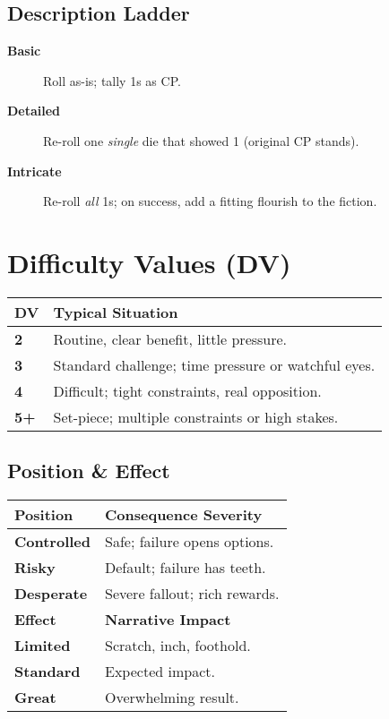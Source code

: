 \begin{multicols}{2}
\subsection*{Description Ladder}
\begin{description}
  \item[\textbf{Basic}] Roll as-is; tally 1s as CP.
  \item[\textbf{Detailed}] Re-roll one \emph{single} die that showed 1 (original CP stands).
  \item[\textbf{Intricate}] Re-roll \emph{all} 1s; on success, add a fitting flourish to the fiction.
\end{description}

\section{Difficulty Values (DV)}
\begin{center}
\begin{tabular}{lp{7.5cm}}
\toprule
\textbf{DV} & \textbf{Typical Situation} \\
\midrule
\textbf{2} & Routine, clear benefit, little pressure. \\
\textbf{3} & Standard challenge; time pressure or watchful eyes. \\
\textbf{4} & Difficult; tight constraints, real opposition. \\
\textbf{5+} & Set-piece; multiple constraints or high stakes. \\
\bottomrule
\end{tabular}
\end{center}

\subsection*{Position \& Effect}
\begin{center}
\begin{tabular}{lp{6.6cm}}
\toprule
\textbf{Position} & \textbf{Consequence Severity} \\
\midrule
\textbf{Controlled} & Safe; failure opens options. \\
\textbf{Risky} & Default; failure has teeth. \\
\textbf{Desperate} & Severe fallout; rich rewards. \\
\midrule
\textbf{Effect} & \textbf{Narrative Impact} \\
\midrule
\textbf{Limited} & Scratch, inch, foothold. \\
\textbf{Standard} & Expected impact. \\
\textbf{Great} & Overwhelming result. \\
\bottomrule
\end{tabular}
\end{center}


\end{multicols}
